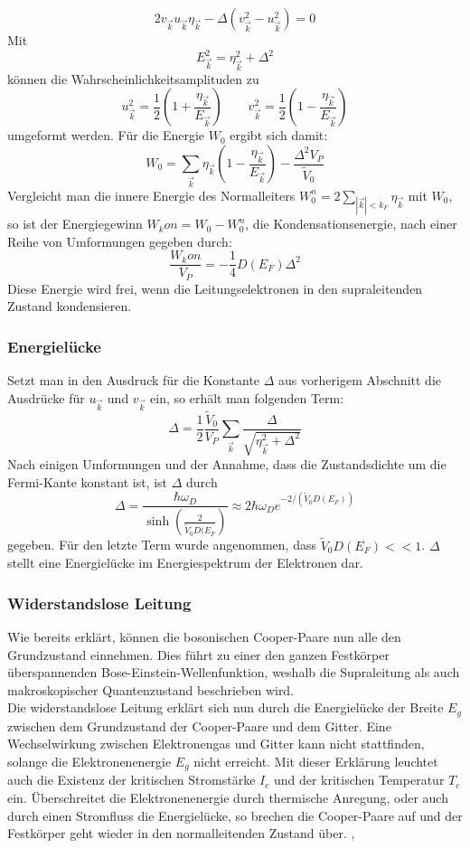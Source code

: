 \[
	2 v_{\vec{k}} u_{\vec{k}} \eta_{\vec{k}} - \Delta(v_{\vec{k}}^2 - u_{\vec{k}}^2)
	=0
\]
Mit
\[
	E_{\vec{k}}^2 = \eta_{\vec{k}}^2 + \Delta^2
\]
können die Wahrscheinlichkeitsamplituden zu 
\[
	u_{\vec{k}}^2 = \frac{1}{2} \left( 1 + \frac{ \eta_{\vec{k}} }{E_{\vec{k}}} 
	\right)
	\qquad 
	v_{\vec{k}}^2 = \frac{1}{2} \left( 1 - \frac{ \eta_{\vec{k}} }{E_{\vec{k}}} 
	\right)
\]
umgeformt werden. Für die Energie $W_0$ ergibt sich damit:
\[
	W_0 = \sum_{\vec{k}} \eta_{\vec{k}} \left( 1-\frac{\eta_{\vec{k}}}{E_{\vec{k}}}
		  \right) - \frac{\Delta^2 V_P}{\tilde{V}_0}
\]
Vergleicht man die innere Energie des Normalleiters $W_0^n = 2 \sum_{|\vec{k}| < k_F}
\eta_{\vec{k}}$ mit $W_0$, so ist der Energiegewinn $W_kon = W_0 - W_0^n$, die 
Kondensationsenergie, nach einer Reihe von Umformungen gegeben durch:
\[
	\frac{W_kon}{V_P} = - \frac{1}{4} D (E_F) \Delta^2
\]
Diese Energie wird frei, wenn die Leitungselektronen in den supraleitenden Zustand
kondensieren.

		\subsubsection{Energielücke}
Setzt man in den Ausdruck für die Konstante $\Delta$ aus vorherigem Abschnitt die
Ausdrücke für $u_{\vec{k}}$ und $v_{\vec{k}}$ ein, so erhält man folgenden Term:
\[
	\Delta = \frac{1}{2} \frac{\tilde{V}_0}{V_P} \sum_{\vec{k}} 
			 \frac{\Delta}{\sqrt{\eta_{\vec{k}}^2 + \Delta^2}}
\]
Nach einigen Umformungen und der Annahme, dass die Zustandsdichte um die Fermi-Kante
konstant ist, ist $\Delta$ durch
\[
	\Delta = \frac{\hbar \omega_D}{\sinh \left( \frac{2}{\tilde{V}_0 D(E_F} \right)}
		   \approx 2 \hbar \omega_D e^{-2 / (\tilde{V}_0 D(E_F))}
\]
gegeben. Für den letzte Term wurde angenommen, dass $\tilde{V}_0 D(E_F) << 1$. 
$\Delta$ stellt eine Energielücke im Energiespektrum der Elektronen dar.

		\subsubsection{Widerstandslose Leitung}
Wie bereits erklärt, können die bosonischen Cooper-Paare nun alle den Grundzustand
einnehmen. Dies führt zu einer den ganzen Festkörper überspannenden 
Bose-Einstein-Wellenfunktion, weshalb die Supraleitung als auch makroskopischer
Quantenzustand beschrieben wird. \\
Die widerstandslose Leitung erklärt sich nun durch die Energielücke der Breite 
$E_g$ zwischen dem Grundzustand der Cooper-Paare und dem Gitter. Eine Wechselwirkung
zwischen Elektronengas und Gitter kann nicht stattfinden, solange die 
Elektronenenergie $E_g$ nicht erreicht. Mit dieser Erklärung leuchtet auch die 
Existenz der kritischen Stromstärke $I_c$ und der kritischen Temperatur $T_c$ ein.
Überschreitet die Elektronenenergie durch thermische Anregung, oder auch durch
einen Stromfluss die Energielücke, so brechen die Cooper-Paare auf und der 
Festkörper geht wieder in den normalleitenden Zustand über. \cite{hunklinger}, 
\cite{suprawiki}

